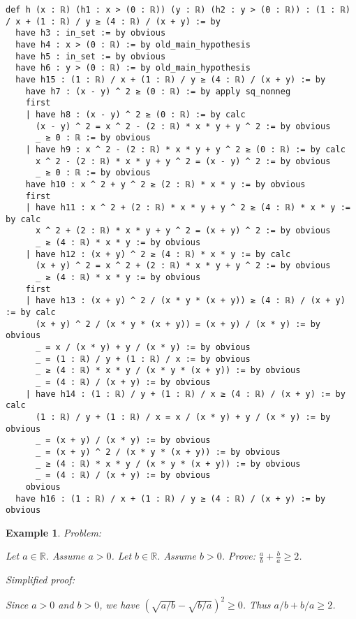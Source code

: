 \documentclass{article}
\newtheorem{example}{Example}
\begin{document}
\begin{tcolorbox}[colback=white!10, width=\linewidth]
\begin{lstlisting}[language=Lean4]
def h (x : ℝ) (h1 : x > (0 : ℝ)) (y : ℝ) (h2 : y > (0 : ℝ)) : (1 : ℝ) / x + (1 : ℝ) / y ≥ (4 : ℝ) / (x + y) := by
  have h3 : in_set := by obvious
  have h4 : x > (0 : ℝ) := by old_main_hypothesis
  have h5 : in_set := by obvious
  have h6 : y > (0 : ℝ) := by old_main_hypothesis
  have h15 : (1 : ℝ) / x + (1 : ℝ) / y ≥ (4 : ℝ) / (x + y) := by
    have h7 : (x - y) ^ 2 ≥ (0 : ℝ) := by apply sq_nonneg
    first
    | have h8 : (x - y) ^ 2 ≥ (0 : ℝ) := by calc
      (x - y) ^ 2 = x ^ 2 - (2 : ℝ) * x * y + y ^ 2 := by obvious
      _ ≥ 0 : ℝ := by obvious
    | have h9 : x ^ 2 - (2 : ℝ) * x * y + y ^ 2 ≥ (0 : ℝ) := by calc
      x ^ 2 - (2 : ℝ) * x * y + y ^ 2 = (x - y) ^ 2 := by obvious
      _ ≥ 0 : ℝ := by obvious
    have h10 : x ^ 2 + y ^ 2 ≥ (2 : ℝ) * x * y := by obvious
    first
    | have h11 : x ^ 2 + (2 : ℝ) * x * y + y ^ 2 ≥ (4 : ℝ) * x * y := by calc
      x ^ 2 + (2 : ℝ) * x * y + y ^ 2 = (x + y) ^ 2 := by obvious
      _ ≥ (4 : ℝ) * x * y := by obvious
    | have h12 : (x + y) ^ 2 ≥ (4 : ℝ) * x * y := by calc
      (x + y) ^ 2 = x ^ 2 + (2 : ℝ) * x * y + y ^ 2 := by obvious
      _ ≥ (4 : ℝ) * x * y := by obvious
    first
    | have h13 : (x + y) ^ 2 / (x * y * (x + y)) ≥ (4 : ℝ) / (x + y) := by calc
      (x + y) ^ 2 / (x * y * (x + y)) = (x + y) / (x * y) := by obvious
      _ = x / (x * y) + y / (x * y) := by obvious
      _ = (1 : ℝ) / y + (1 : ℝ) / x := by obvious
      _ ≥ (4 : ℝ) * x * y / (x * y * (x + y)) := by obvious
      _ = (4 : ℝ) / (x + y) := by obvious
    | have h14 : (1 : ℝ) / y + (1 : ℝ) / x ≥ (4 : ℝ) / (x + y) := by calc
      (1 : ℝ) / y + (1 : ℝ) / x = x / (x * y) + y / (x * y) := by obvious
      _ = (x + y) / (x * y) := by obvious
      _ = (x + y) ^ 2 / (x * y * (x + y)) := by obvious
      _ ≥ (4 : ℝ) * x * y / (x * y * (x + y)) := by obvious
      _ = (4 : ℝ) / (x + y) := by obvious
    obvious
  have h16 : (1 : ℝ) / x + (1 : ℝ) / y ≥ (4 : ℝ) / (x + y) := by obvious

\end{lstlisting}
\end{tcolorbox}


\begin{example}
Problem:
\begin{tcolorbox}[colback=yellow!10, width=\linewidth]
Let $a\in\mathbb{R}$. Assume $a > 0$.
    Let $b\in\mathbb{R}$. Assume $b > 0$.
    Prove: $\frac{a}{b} + \frac{b}{a} \ge 2$.
\end{tcolorbox}

Simplified proof:
\begin{tcolorbox}[colback=blue!10, width=\linewidth]
Since $a>0$ and $b>0$, we have $(\sqrt{a/b} - \sqrt{b/a})^2 \ge 0$. Thus $a/b + b/a \ge 2$.
\end{tcolorbox}
\end{example}
\end{document}
